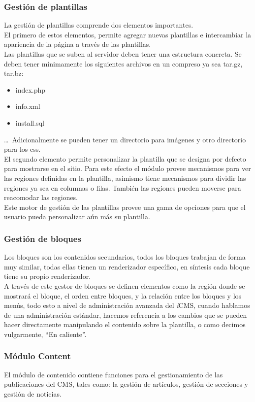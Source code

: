 \subsubsection{Gesti\'on de plantillas}
La gesti\'on de plantillas comprende dos elementos importantes.\\
El primero de estos elementos, permite agregar nuevas plantillas e intercambiar la apariencia de la p\'agina a trav\'es de las plantillas.\\
Las plantillas que se suben al servidor deben tener una estructura concreta. Se deben tener m\'inimamente los siguientes archivos en un compreso ya sea tar.gz, tar.bz:
\begin{itemize}
\item index.php
\item info.xml
\item install.sql
\end{itemize}
\ldots\ Adicionalmente se pueden tener un directorio para im\'agenes y otro directorio para los css.\\
El segundo elemento permite personalizar la plantilla que se designa por defecto para mostrarse en el sitio. Para este efecto el m\'odulo provee mecanismos para ver las regiones definidas en la plantilla, asimismo tiene mecanismos para dividir las regiones ya sea en columnas o filas. Tambi\'en las regiones pueden moverse para reacomodar las regiones.\\
Este motor de gesti\'on de las plantillas provee una gama de opciones para que el usuario pueda personalizar a\'un m\'as su plantilla.

\subsubsection{Gesti\'on de bloques}
Los bloques son los contenidos secundarios, todos los bloques trabajan de forma muy similar, todas ellas tienen un renderizador espec\'ifico, en s\'intesis cada bloque tiene su propio renderizador.\\
A trav\'es de este gestor de bloques se definen elementos como la regi\'on donde se mostrar\'a el bloque, el orden entre bloques, y la relaci\'on entre los bloques y los men\'us, todo esto a nivel de administraci\'on avanzada del \textit{i}CMS, cuando hablamos de una administraci\'on est\'andar, hacemos referencia a los cambios que se pueden hacer directamente manipulando el contenido sobre la plantilla, o como decimos vulgarmente, ``En caliente''.

\subsubsection{M\'odulo Content}
El m\'odulo de contenido contiene funciones para el gestionamiento de las publicaciones del CMS, tales como: la gesti\'on de art\'iculos, gesti\'on de secciones y gesti\'on de noticias.

